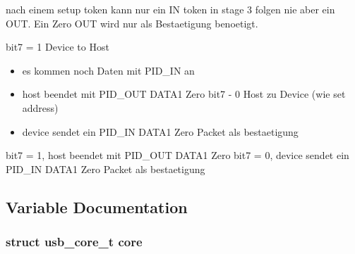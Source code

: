 nach einem setup token kann nur ein IN token in stage 3 folgen nie aber ein OUT. Ein Zero OUT wird nur als Bestaetigung benoetigt.

bit7 = 1 Device to Host\begin{itemize}
\item es kommen noch Daten mit PID\_\-IN an\item host beendet mit PID\_\-OUT DATA1 Zero bit7 - 0 Host zu Device (wie set address)\item device sendet ein PID\_\-IN DATA1 Zero Packet als bestaetigung\end{itemize}


bit7 = 1, host beendet mit PID\_\-OUT DATA1 Zero bit7 = 0, device sendet ein PID\_\-IN DATA1 Zero Packet als bestaetigung 

\subsection{Variable Documentation}
\subsubsection{\setlength{\rightskip}{0pt plus 5cm}struct {\bf usb\_\-core\_\-t}  {\bf core}}\label{core_8h_e79ca4bd27b7b91dc5296ab6ada4ba8a}


